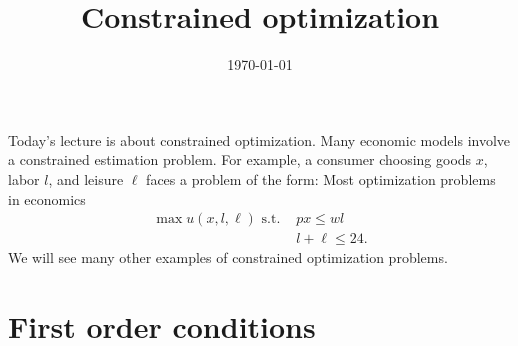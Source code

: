 \documentclass[12pt,reqno]{amsart}
\title{Constrained optimization}
\date{\today}
\theoremstyle{definition}
\begin{document}
\maketitle

Today's lecture is about constrained optimization. Many economic
models involve a constrained estimation problem. For example, a
consumer choosing goods $x$, labor $l$, and leisure $\ell$ faces a
problem of the form:
Most optimization
problems in economics 
\begin{align*} 
  \max u(x,l,\ell) \text{ s.t. } & px \leq wl \\
  & l + \ell \leq 24.
\end{align*}
We will see many other examples of constrained optimization problems. 

\section{First order conditions}
\end{document}
